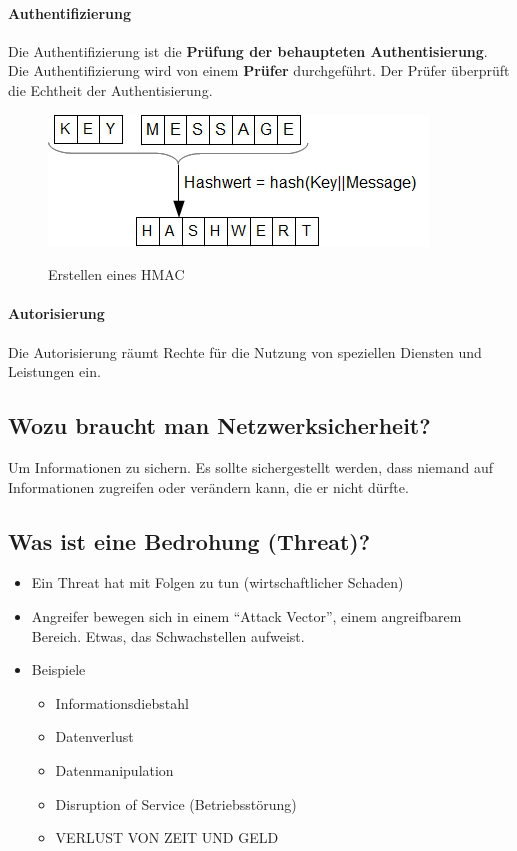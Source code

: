 \paragraph*{Authentifizierung}\label{par:Authentification}\label{para:Authentifizierung}Die Authentifizierung ist die \textbf{Prüfung der behaupteten Authentisierung}. Die Authentifizierung wird von einem \textbf{Prüfer} durchgeführt. Der Prüfer überprüft die Echtheit der Authentisierung.
\begin{figure}[H]
    \begin{center}
    \label{pic:HMAC}
    \includegraphics[width=\textwidth]{images/hmac.png}
    \caption{Erstellen eines HMAC}
    \end{center}
\end{figure}

\paragraph*{Autorisierung}\label{par:Authorization}\label{para:Autorisierung}Die Autorisierung räumt Rechte für die Nutzung von speziellen Diensten und Leistungen ein.

\subsection*{Wozu braucht man Netzwerksicherheit?}
Um Informationen zu sichern. Es sollte sichergestellt werden, dass niemand auf Informationen zugreifen oder verändern kann, die er nicht dürfte.

\subsection*{Was ist eine Bedrohung (Threat)?}
\begin{itemize}
    \item Ein Threat hat mit Folgen zu tun (wirtschaftlicher Schaden)
    \item Angreifer bewegen sich in einem "`Attack Vector"', einem angreifbarem Bereich. Etwas, das Schwachstellen aufweist.
    \item Beispiele
    \begin{itemize}
        \item Informationsdiebstahl
        \item Datenverlust
        \item Datenmanipulation
        \item Disruption of Service (Betriebsstörung)
        \item VERLUST VON ZEIT UND GELD
    \end{itemize}
\end{itemize}

